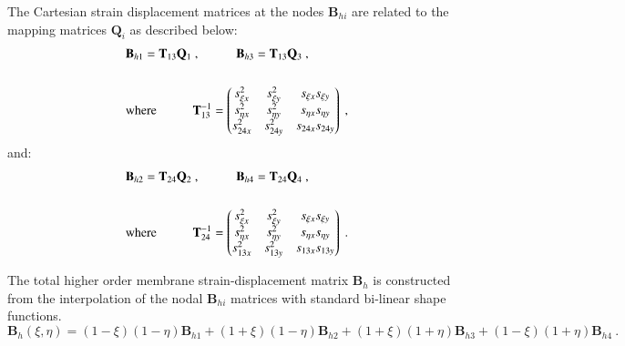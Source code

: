 The Cartesian strain displacement matrices at the nodes $\mathbf{B}_{hi}$ are related to the mapping matrices $\mathbf{Q}_i$ as described below:
\begin{gather} 
	\begin{aligned}
		&\mathbf{B}_{h1} = \mathbf{T}_{13}  \mathbf{Q}_{1}\ ,
		\hspace{10mm}
		\mathbf{B}_{h3} = \mathbf{T}_{13}  \mathbf{Q}_{3}\ ,
		\\
		\\
		&\text{where}
		\hspace{10mm} 
		\mathbf{T}_{13}^{-1} =
		\begin{pmatrix}
			s_{\xi x}^2 & s_{\xi y}^2 & s_{\xi x} s_{\xi y} \\
			s_{\eta x}^2 & s_{\eta y}^2 & s_{\eta x} s_{\eta y} \\
			s_{24 x}^2 & s_{24 y}^2 & s_{24 x} s_{24 y}
		\end{pmatrix}
		\label{equation17}\ ,
	\end{aligned}
\end{gather}
and:
\begin{gather} 
	\begin{aligned}
		&\mathbf{B}_{h2} = \mathbf{T}_{24}  \mathbf{Q}_{2}\ ,
		\hspace{10mm}
		\mathbf{B}_{h4} = \mathbf{T}_{24}  \mathbf{Q}_{4}\ ,
		\\
		\\
		&\text{where} 
		\hspace{10mm} 
		\mathbf{T}_{24}^{-1} =
		\begin{pmatrix}
			s_{\xi x}^2 & s_{\xi y}^2 & s_{\xi x} s_{\xi y} \\
			s_{\eta x}^2 & s_{\eta y}^2 & s_{\eta x} s_{\eta y} \\
			s_{13 x}^2 & s_{13 y}^2 & s_{13 x} s_{13 y}
		\end{pmatrix}
		\label{equation18}\ .
	\end{aligned}
\end{gather}

The total higher order membrane strain-displacement matrix $\mathbf{B}_h$ is constructed from the interpolation of the nodal $\mathbf{B}_{hi}$ matrices with standard bi-linear shape functions.
\begin{equation} 
\mathbf{B}_h(\xi,\eta) = (1-\xi)(1-\eta)\mathbf{B}_{h1} + (1+\xi)(1-\eta)\mathbf{B}_{h2} + (1+\xi)(1+\eta)\mathbf{B}_{h3} +	(1-\xi)(1+\eta)\mathbf{B}_{h4} 
\label{equation19}\ .
\end{equation}

